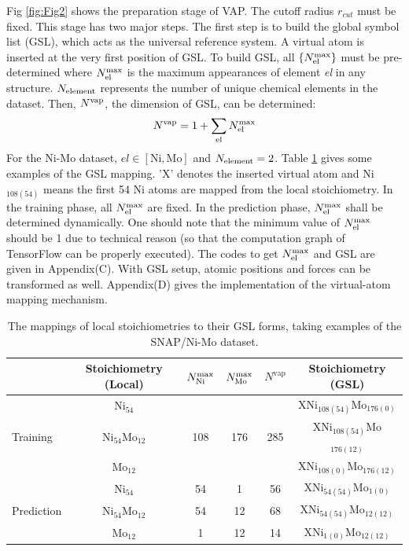 \documentclass[preprint]{revtex4-2}
\begin{document}
Fig \ref{fig:Fig2} shows the preparation stage of VAP. The cutoff radius 
$r_{cut}$ must be fixed. This stage has two major steps. The first step is to 
build the global symbol list (GSL), which acts as the universal reference 
system. A virtual atom is inserted at the very first position of GSL. 
To build GSL, all $\{N^{\mathrm{max}}_{\mathrm{el}}\}$ must be pre-determined where $N^{\mathrm{max}}_{\mathrm{el}}$ is the 
maximum appearances of element \textit{el} in any structure. $N_{\mathrm{element}}$ represents 
the number of unique chemical elements in the dataset. Then, $N^{\mathrm{vap}}$, the 
dimension of GSL, can be determined:
\begin{equation}
\label{eq:n_vap}
N^{\mathrm{vap}} = 1 + \sum_{\mathrm{el}}{N^{\mathrm{max}}_{\mathrm{el}}}
\end{equation}
For the Ni-Mo dataset, $el \in [\mathrm{Ni}, \mathrm{Mo}]$ and 
$N_{\mathrm{element}} = 2$. 
Table \ref{table:GSL} gives some examples of the GSL mapping. 'X' denotes the 
inserted virtual atom and Ni$_{108(54)}$ means the first 54 Ni atoms are mapped 
from the local stoichiometry. In the training phase, all $N^{\mathrm{max}}_{\mathrm{el}}$ are fixed.
In the prediction phase, $N^{\mathrm{max}}_{\mathrm{el}}$ shall be determined dynamically. One should 
note that the minimum value of $N^{\mathrm{max}}_{\mathrm{el}}$ should be 1 due to technical reason (so 
that the computation graph of TensorFlow can be properly executed). The codes to
get $N^{\mathrm{max}}_{\mathrm{el}}$ and GSL are given in Appendix(C). With GSL setup, atomic positions
and forces can be transformed as well. Appendix(D) gives the implementation of 
the virtual-atom mapping mechanism. 

% 
%
\begin{table}[h]
\centering
\begin{tabular}{lccccc}
\hline
 & Stoichiometry (Local) & $N^{\mathrm{max}}_{\mathrm{Ni}}$ & $N^{\mathrm{max}}_{\mathrm{Mo}}$ & $N^{\mathrm{vap}}$ 
 & Stoichiometry (GSL) \\
\hline
 & Ni$_{54}$ &  &  &  & XNi$_{108(54)}$Mo$_{176(0)}$ \\
Training & Ni$_{54}$Mo$_{12}$ & 108 & 176 & 285 
 & XNi$_{108(54)}$Mo$_{176(12)}$ \\
 & Mo$_{12}$ &  &  &  & XNi$_{108(0)}$Mo$_{176(12)}$ \\
\hline
 & Ni$_{54}$ & 54 & 1 & 56 & XNi$_{54(54)}$Mo$_{1(0)}$ \\
Prediction & Ni$_{54}$Mo$_{12}$ & 54 & 12 & 68 & XNi$_{54(54)}$Mo$_{12(12)}$ \\
 & Mo$_{12}$ & 1 & 12 & 14 & XNi$_{1(0)}$Mo$_{12(12)}$ \\
\hline
\end{tabular}
\caption{\label{table:GSL}
The mappings of local stoichiometries to their GSL forms, taking examples of the 
SNAP/Ni-Mo dataset.
}
\end{table}
\end{document}

